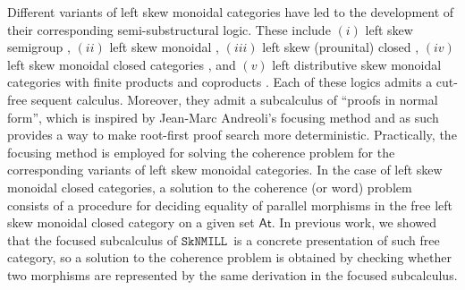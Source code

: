\documentclass[sn-mathphys-num]{sn-jnl}%
\newcommand{\SkNMILL}{$\mathtt{SkNMILL}$}
\theoremstyle{thmstyleone}%
\theoremstyle{thmstyletwo}%
\theoremstyle{thmstylethree}%
\begin{document}
Different variants of left skew monoidal categories have led to the development of their corresponding semi-substructural logic.
These include $(i)$ left skew semigroup \cite{zeilberger:semiassociative:19}, $(ii)$ left skew monoidal \cite{uustalu:sequent:2021}, $(iii)$ left skew (prounital) closed \cite{uustalu:deductive:nodate}, $(iv)$ left skew monoidal closed categories \cite{UVW:protsn,veltri:multifocus:23,wan2024}, and $(v)$ left distributive skew monoidal categories with finite products and coproducts \cite{VW:2023}.
Each of these logics admits a cut-free sequent calculus. Moreover, they admit a subcalculus of ``proofs in normal form'', which is inspired by Jean-Marc Andreoli's focusing method \cite{andreoli:logic:1992} and as such provides a way to make root-first proof search more deterministic.
Practically, the focusing method is employed for solving the coherence problem for the corresponding variants of left skew monoidal categories. In the case of left skew monoidal closed categories, a solution to the coherence (or word) problem consists of a procedure for deciding equality of parallel morphisms in the free left skew monoidal closed category on a given set $\mathsf{At}$.
In previous work, we showed that the focused subcalculus of \SkNMILL\ is a concrete presentation of such free category, so a solution to the coherence problem is obtained by checking whether two morphisms are represented by the same derivation in the focused subcalculus.
\end{document}
